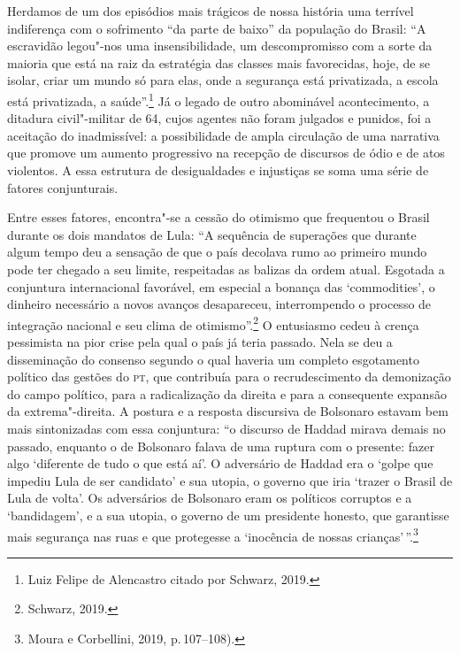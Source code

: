 Herdamos de um dos episódios mais trágicos de nossa história uma
terrível indiferença com o sofrimento ``da parte de baixo'' da população
do Brasil: ``A escravidão legou"-nos uma insensibilidade, um
descompromisso com a sorte da maioria que está na raiz da estratégia das
classes mais favorecidas, hoje, de se isolar, criar um mundo só para
elas, onde a segurança está privatizada, a escola está privatizada, a
saúde''.\footnote{Luiz Felipe de Alencastro citado por Schwarz, 2019.}
Já o legado de outro abominável acontecimento, a ditadura civil"-militar
de 64, cujos agentes não foram julgados e punidos, foi a aceitação do
inadmissível: a possibilidade de ampla circulação de uma narrativa que
promove um aumento progressivo na recepção de discursos de ódio e de
atos violentos. A essa estrutura de desigualdades e injustiças se soma
uma série de fatores conjunturais.

Entre esses fatores, encontra"-se a cessão do otimismo que frequentou o
Brasil durante os dois mandatos de Lula: ``A sequência de superações que
durante algum tempo deu a sensação de que o país decolava rumo ao
primeiro mundo pode ter chegado a seu limite, respeitadas as balizas da
ordem atual. Esgotada a conjuntura internacional favorável, em especial
a bonança das `commodities', o dinheiro necessário a novos avanços
desapareceu, interrompendo o processo de integração nacional e seu clima
de otimismo''.\footnote{Schwarz, 2019.} O entusiasmo cedeu à crença
pessimista na pior crise pela qual o país já teria passado. Nela se deu
a disseminação do consenso segundo o qual haveria um completo
esgotamento político das gestões do \textsc{pt}, que contribuía para o
recrudescimento da demonização do campo político, para a radicalização
da direita e para a consequente expansão da extrema"-direita. A postura e
a resposta discursiva de Bolsonaro estavam bem mais sintonizadas com
essa conjuntura: ``o discurso de Haddad mirava demais no passado,
enquanto o de Bolsonaro falava de uma ruptura com o presente: fazer algo
`diferente de tudo o que está aí'. O adversário de Haddad era o `golpe
que impediu Lula de ser candidato' e sua utopia, o governo que iria
`trazer o Brasil de Lula de volta'. Os adversários de Bolsonaro eram os
políticos corruptos e a `bandidagem', e a sua utopia, o governo de um
presidente honesto, que garantisse mais segurança nas ruas e que
protegesse a `inocência de nossas crianças'\,''.\footnote{Moura e
  Corbellini, 2019, p.\,107--108).}

